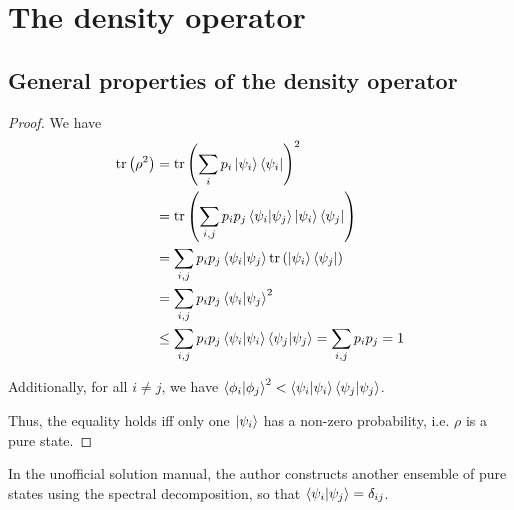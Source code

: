 \documentclass[../main.tex]{subfiles}
\begin{document}
\setcounter{chapter}{2}
\setcounter{section}{3}
\setcounter{exercise}{70}
\section{The density operator}

\setcounter{subsection}{1}
\subsection{General properties of the density operator}

\begin{exercise}
\end{exercise}

\begin{proof}
    We have
    \begin{align*}
        \mathrm{tr}\left(\rho^2\right)
        &= \mathrm{tr}\left(\sum_i p_i\ket{\psi_i}\bra{\psi_i}\right)^2 \\
        &= \mathrm{tr}\left(\sum_{i,j}p_i p_j \braket{\psi_i\vert\psi_j} \ket{\psi_i}\bra{\psi_j}\right) \\
        &= \sum_{i,j} p_i p_j \braket{\psi_i\vert\psi_j} \mathrm{tr}\left(\ket{\psi_i}\bra{\psi_j}\right) \\
        &= \sum_{i,j} p_i p_j \braket{\psi_i\vert\psi_j}^2 \\
        &\leq \sum_{i,j} p_i p_j \braket{\psi_i\vert\psi_i} \braket{\psi_j\vert\psi_j} = \sum_{i,j} p_i p_j = 1
    \end{align*}
    
    Additionally, for all $i\neq j$, we have $\braket{\phi_i\vert\phi_j}^2<\braket{\psi_i\vert\psi_i} \braket{\psi_j\vert\psi_j}$.
    
    Thus, the equality holds iff only one $\ket{\psi_i}$ has a non-zero probability, i.e. $\rho$ is a pure state.
\end{proof}

\begin{remark}
    In the unofficial solution manual, the author constructs another ensemble of pure states using the spectral decomposition, so that $\braket{\psi_i\vert\psi_j}=\delta_{i j}$.
\end{remark}
\end{document}
